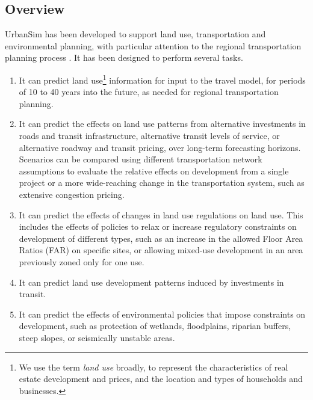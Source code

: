 \subsection{Overview}


UrbanSim has been developed to support land use, transportation and environmental planning, with particular attention to the regional transportation planning process \citep{waddell-japa-2002, waddell-tra-2007, waddell-tr-2011}. It has been designed to perform several tasks.


\begin{enumerate}
\item It can predict land use\footnote{We use the term \emph{land use} broadly, to represent the characteristics of real estate development and prices, and the location and types of households and businesses.} information for input to the travel model, for periods of 10 to 40 years into the future, as needed for regional transportation planning.

\item It can predict the effects on land use patterns from alternative investments in roads and transit infrastructure, alternative transit levels of service, or alternative roadway and transit pricing, over long-term forecasting horizons. Scenarios can be compared using different transportation network assumptions to evaluate the relative effects on development from a single project or a more wide-reaching change in the transportation system, such as extensive congestion pricing.

\item It can predict the effects of changes in land use regulations on land use. This includes the effects of policies to relax or increase regulatory constraints on development of different types, such as an increase in the allowed Floor Area Ratios (FAR) on specific sites, or allowing mixed-use development in an area previously zoned only for one use.

\item It can predict land use development patterns induced by investments in transit.

\item It can predict the effects of environmental policies that impose constraints on development, such as protection of wetlands, floodplains, riparian buffers, steep slopes, or seismically unstable areas.


\end{enumerate}
